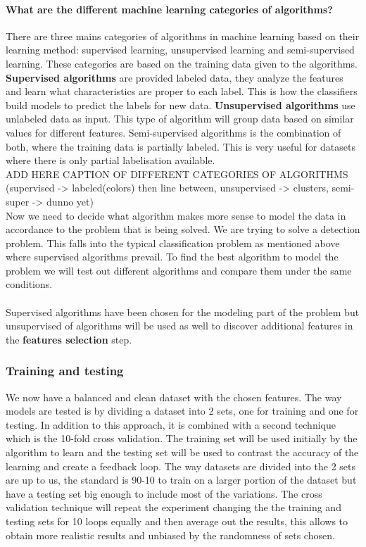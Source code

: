 \paragraph{What are the different machine learning categories of algorithms?}
There are three mains categories of algorithms in machine learning based on their learning method: supervised learning, unsupervised learning and semi-supervised learning.
These categories are based on the training data given to the algorithms. \textbf{Supervised algorithms} are provided labeled data, they analyze the features and learn what characteristics are proper to each label. This is how the classifiers build models to predict the labels for new data.
\textbf{Unsupervised algorithms} use unlabeled data as input. This type of algorithm will group data based on similar values for different features.
Semi-supervised algorithms is the combination of both, where the training data is partially labeled. This is very useful for datasets where there is only partial labelisation available.
\\
ADD HERE CAPTION OF DIFFERENT CATEGORIES OF ALGORITHMS (supervised -> labeled(colors) then line between, unsupervised -> clusters, semi-super -> dunno yet)
\\
Now we need to decide what algorithm makes more sense to model the data in accordance to the problem that is being solved. We are trying to solve a detection problem. This falls into the typical classification problem as mentioned above where supervised algorithms prevail. To find the best algorithm to model the problem we will test out different algorithms and compare them under the same conditions.
\\
\\
Supervised algorithms have been chosen for the modeling part of the problem but unsupervised of algorithms will be used as well to discover additional features in the \textbf{features selection} step.

\subsubsection{Training and testing}
We now have a balanced and clean dataset with the chosen features. The way models are tested is by dividing a dataset into 2 sets, one for training and one for testing. In addition to this approach, it is combined with a second technique which is the 10-fold cross validation\cite{10-fold}. The training set will be used initially by the algorithm to learn and the testing set will be used to contrast the accuracy of the learning and create a feedback loop. The way datasets are divided into the 2 sets are up to us, the standard is 90-10 to train on a larger portion of the dataset but have a testing set big enough to include most of the variations. The cross validation technique will repeat the experiment changing the the training and testing sets for 10 loops equally and then average out the results, this allows to obtain more realistic results and unbiased by the randomness of sets chosen.

